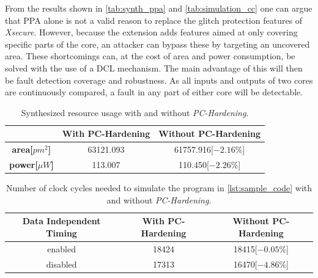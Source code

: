From the results shown in \autoref{tab:synth_ppa} and \autoref{tab:simulation_cc} one can argue that PPA alone is not a valid reason to replace the glitch protection features of \textit{Xsecure}. However, because the extension adds features aimed at only covering specific parts of the core, an attacker can bypass these by targeting an uncovered area. These shortcomings can, at the cost of area and power consumption, be solved with the use of a DCL mechanism. The main advantage of this will then be fault detection coverage and robustness. As all inputs and outputs of two cores are continuously compared, a fault in any part of either core will be detectable.  

\begin{table}[h]
\centering
\caption{Synthesized resource usage with and without \textit{PC-Hardening}.}
\label{tab:synth_ppa}
\begin{tabular}{ccc}
\toprule 
& With PC-Hardening & Without PC-Hardening \\
\midrule
\rowcolor{black!20} \textbf{area[$pm^2$]} & 63121.093 & 61757.916[$-2.16\%$] \\
\textbf{power[$\mu W$]} & 113.007 & 110.450[$-2.26\%$] \\
\bottomrule
\end{tabular}
\end{table}

\begin{table}[h]
\centering
\caption{Number of clock cycles needed to simulate the program in \autoref{lst:sample_code} with and without \textit{PC-Hardening}.}
\label{tab:simulation_cc}
\begin{tabular}{c|cc}
\toprule 
Data Independent Timing & With PC-Hardening & Without PC-Hardening \\
\midrule
\rowcolor{black!20} enabled & 18424 & 18415[$-0.05\%$] \\
disabled & 17313 & 16470[$-4.86\%$] \\
\bottomrule
\end{tabular}
\end{table}



